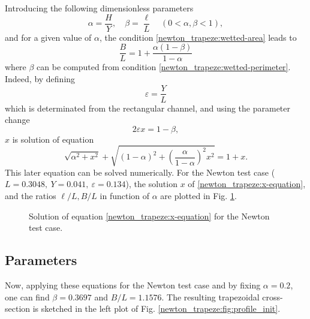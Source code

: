 Introducing the following dimensionless parameters
\begin{equation*}
 \alpha = \frac{H}{Y}, \quad \beta = \frac{\ell}{L} \quad (0 < \alpha, \beta < 1),
\end{equation*}
and for a given value of $\alpha$, the condition \eqref{newton_trapeze:wetted-area} leads to
\begin{equation*}
\frac{B}{L} = 1 + \frac{\alpha(1-\beta)}{1-\alpha}
\end{equation*}
where $\beta$ can be computed from condition \eqref{newton_trapeze:wetted-perimeter}.
Indeed, by defining
\begin{equation*}
  \varepsilon = \frac{Y}{L}
\end{equation*}
which is determinated from the rectangular channel, and using
the parameter change
\begin{equation*}
2\varepsilon x = 1-\beta,
\end{equation*}
$x$ is solution of equation
\begin{equation}\label{newton_trapeze:x-equation}
\sqrt{\alpha^2 + x^2} + \sqrt{(1-\alpha)^2 + \left(\frac{\alpha}{1-\alpha}\right)^2x^2} = 1+x.
\end{equation}
This later equation can be solved numerically. For the Newton test case ($L = 0.3048, ~ Y = 0.041, ~ \varepsilon = 0.134$), the solution $x$ of \eqref{newton_trapeze:x-equation}, and the ratios $\ell/L, B/L$ in function of $\alpha$ are plotted in Fig. \ref{newton_trapeze:fig:x-solution}.
\begin{figure}[!ht]
 \centering
 \caption{Solution of equation \eqref{newton_trapeze:x-equation} for the Newton test case.}
 \label{newton_trapeze:fig:x-solution}
\end{figure}

\subsection{Parameters}

Now, applying these equations for the Newton test case and by fixing $\alpha = 0.2$,
one can find $\beta = 0.3697$ and $B/L = 1.1576$. The resulting trapezoidal cross-section
is sketched in the left plot of Fig. \ref{newton_trapeze:fig:profile_init}.

